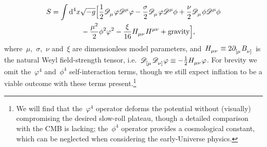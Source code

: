 \documentclass[aps,prd,reprint,preprintnumbers,showpacs,floatfix,nofootinbib,superscript address]{revtex4-2}
\begin{document}
\begin{align}\label{ToyModel}
		S=\int\mathrm{d}^4x\sqrt{-g}\Big[&\frac{1}{2}\SCovD{_\mu}\varphi\SCovD{^\mu}\varphi
		-\frac{\sigma}{2}\SCovD{_\mu}\varphi\SCovD{^\mu}\phi
		+\frac{\nu}{2}\SCovD{_\mu}\phi\SCovD{^\mu}\phi
		\nonumber\\&
		\hspace{-25pt}
		-\frac{\mu^2}{2}\phi^2\varphi^2
		-\frac{\xi}{16}\MAGH{_{\mu\nu}}\MAGH{^{\mu\nu}}+\text{gravity}\Big],
\end{align}
where~$\mu$,~$\sigma$,~$\nu$ and~$\xi$ are dimensionless model parameters, and~$\MAGH{_{\mu\nu}}\equiv 2\PD{_{[\mu}}\FieldV{_{\nu]}}$ is the natural Weyl field-strength tensor, i.e.~$\SCovD{_{[\mu}}\SCovD{_{\nu]}}\varphi\equiv-\frac{1}{2}\MAGH{_{\mu\nu}}\varphi$. For brevity we omit the~$\varphi^4$ and~$\phi^4$ self-interaction terms, though we still expect inflation to be a viable outcome with these terms present.\footnote{We will find that the~$\varphi^4$ operator deforms the potential without (visually) compromising the desired slow-roll plateau, though a detailed comparison with the CMB is lacking; the~$\phi^4$ operator provides a cosmological constant, which can be neglected when considering the early-Universe physics.}
\end{document}
